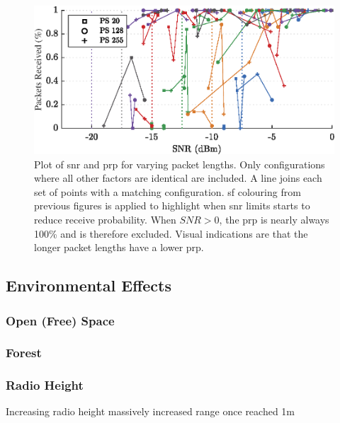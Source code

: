 \begin{figure}[H]
    \centering
   	\includegraphics{Figures/pl_pp_plot}
    \caption[Effect of Packet Length on \ac{snr} and \ac{prp}]{
    Plot of \ac{snr} and \ac{prp} for varying packet lengths. Only configurations where all other factors are identical are included. A line joins each set of points with a matching configuration. \ac{sf} colouring from previous figures is applied to highlight when \ac{snr} limits starts to reduce receive probability. When $SNR > 0$, the \ac{prp} is nearly always 100\% and is therefore excluded. Visual indications are that the longer packet lengths have a lower \ac{prp}.
    }
    \label{fig:pl_pp_plot}
\end{figure}

\subsection{Environmental Effects}
\subsubsection{Open (Free) Space}

\subsubsection{Forest}
\subsubsection{Radio Height}
Increasing radio height massively increased range once reached 1m


